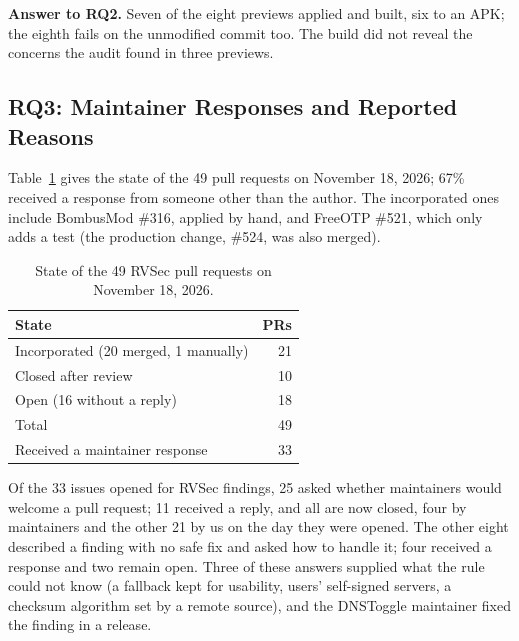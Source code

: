 \documentclass[conference]{IEEEtran}
\newcommand{\researchq}[1]{\textbf{RQ#1}}
\begin{document}
\textbf{Answer to \researchq{2}.} Seven of the eight previews applied and
built, six to an APK; the eighth fails on the unmodified commit too. The build
did not reveal the concerns the audit found in three previews.

\subsection{\researchq{3}: Maintainer Responses and Reported Reasons}
\label{subsec:rq3}

Table~\ref{tab:pr-state} gives the state of the 49 pull requests on November
18, 2026; 67\% received a response from someone other than the author. The
incorporated ones include BombusMod \#316, applied by hand, and FreeOTP \#521,
which only adds a test (the production change, \#524, was also merged).

\begin{table}[H]
\centering
\caption{State of the 49 RVSec pull requests on November 18, 2026.}
\label{tab:pr-state}
\begin{tabular}{lr}
\toprule
State & PRs \\
\midrule
Incorporated (20 merged, 1 manually) & 21 \\
Closed after review                  & 10 \\
Open (16 without a reply)            & 18 \\
\midrule
Total                                & 49 \\
Received a maintainer response       & 33 \\
\bottomrule
\end{tabular}
\end{table}

Of the 33 issues opened for RVSec findings, 25 asked whether maintainers would
welcome a pull request; 11 received a reply, and all are now closed, four by
maintainers and the other 21 by us on the day they were opened. The other
eight described a finding with no safe fix and asked how to handle it; four
received a response and two remain open. Three of these answers supplied what
the rule could not know (a fallback kept for usability, users' self-signed
servers, a checksum algorithm set by a remote source), and the DNSToggle
maintainer fixed the finding in a release.
\end{document}
